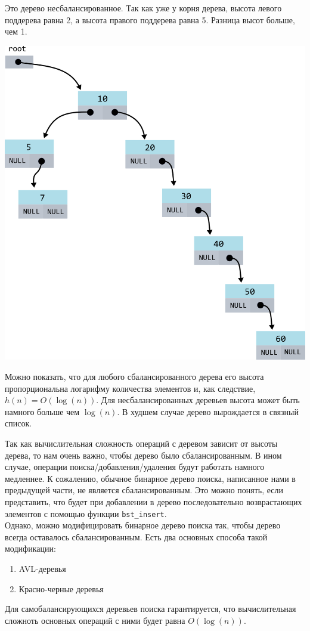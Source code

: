 \documentclass{article}
\begin{document}
\begin{multicols}{2}
Это дерево несбалансированное. Так как уже у корня дерева, высота левого поддерева равна 2, а высота правого поддерева равна 5. Разница высот больше, чем 1.
\begin{center}
\includegraphics[scale=0.9]{../images/unbalanced_tree.png}
\end{center}
\end{multicols}

Можно показать, что для любого сбалансированного дерева его высота пропорциональна логарифму количества элементов и, как следствие, $h(n) = O(\log(n))$. Для несбалансированных деревьев высота может быть намного больше чем $\log(n)$. В худшем случае дерево вырождается в связный список.

Так как вычислительная сложность операций с деревом зависит от высоты дерева, то нам очень важно, чтобы дерево было сбалансированным. В ином случае, операции поиска/добавления/удаления будут работать намного медленнее. К сожалению, обычное бинарное дерево поиска, написанное нами в предыдущей части, не является сбалансированным. Это можно понять, если представить, что будет при добавлении в дерево последовательно возврастающих элементов с помощью функции \texttt{bst\_insert}.\\

Однако, можно модифицировать бинарное дерево поиска так, чтобы дерево всегда оставалось сбалансированным. Есть два основных способа такой модификации:
\begin{enumerate}
\item AVL-деревья
\item Красно-черные деревья
\end{enumerate}
Для самобалансирующихся деревьев поиска гарантируется, что вычислительная сложноть основных операций с ними будет равна $O(\log(n))$.
\end{document}
